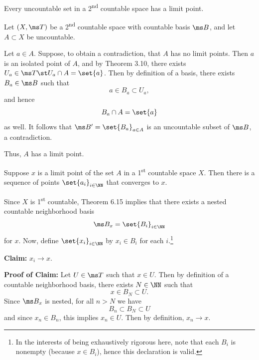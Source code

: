 \documentclass{fkpset}
\begin{document}
  \begin{problem}[6.11]
    Every uncountable set in a 2\textsuperscript{nd} countable space
    has a limit point.
  \end{problem}
  \begin{solution}
    Let $(X, \ms T)$ be a 2\textsuperscript{nd} countable space with
    countable basis $\ms B$, and let $A \subset X$ be uncountable.

    Let $a \in A$. Suppose, to obtain a contradiction, that $A$ has no
    limit points. Then $a$ is an isolated point of $A$, and by Theorem
    3.10, there exists $U_a \in \ms T \st U_a \cap A = \set{a}$. Then
    by definition of a basis, there exists $B_a \in \ms B$ such that
    \[
      a \in B_a \subset U_a,
    \]
    and hence
    \[
      B_a \cap A = \set{a}
    \]
    as well. It follows that $\ms B' = \set{B_a}_{a \in A}$ is an
    uncountable subset of $\ms B$, a contradiction.

    Thus, $A$ has a limit point.
  \end{solution}
  \clearpage

  \begin{problem}[6.18]
    Suppose $x$ is a limit point of the set $A$ in a
    1\textsuperscript{st} countable space $X$. Then there is a
    sequence of points $\set{a_i}_{i \in \NN}$ that converges to $x$.
  \end{problem}
  \begin{solution}
    Since $X$ is 1\textsuperscript{st} countable, Theorem 6.15 implies
    that there exists a nested countable neighborhood basis
    \[
      \ms B_x = \set{B_i}_{i\in \NN}
    \]
    for $x$. Now, define $\set{x_i}_{i\in \NN}$ by $x_i \in B_i$ for
    each $i$.\footnote{In the interests of being exhaustively rigorous
      here, note that each $B_i$ is nonempty (because $x \in B_i$),
      hence this declaration is valid.}

    \textbf{Claim:} $x_i \to x$.

    \textbf{Proof of Claim:} Let $U \in \ms T$ such that $x \in U$.
    Then by definition of a countable neighborhood basis, there exists
    $N \in \NN$ such that
    \[
      x \in B_{N} \subset U.
    \]
    Since $\ms B_x$ is nested, for all $n > N$ we have
    \[
      B_n \subset B_N \subset U
    \]
    and since $x_n \in B_n$, this implies $x_n \in U$. Then by
    definition, $x_n \to x$.
  \end{solution}
\end{document}
